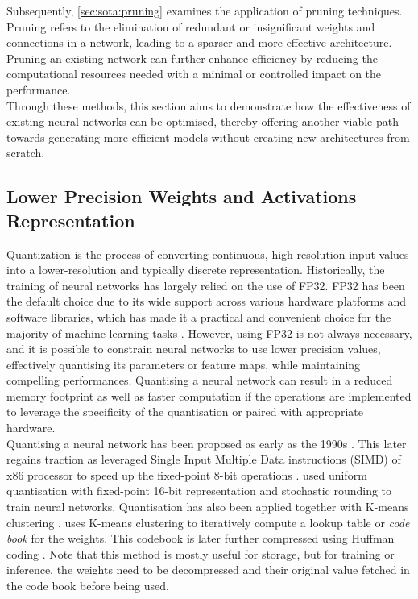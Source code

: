 Subsequently, \cref{sec:sota:pruning} examines the application of
pruning techniques. Pruning refers to the elimination of redundant or
insignificant weights and connections in a network, leading to a sparser and
more effective architecture. Pruning an existing network can further enhance
efficiency by reducing the computational resources needed with a minimal or
controlled impact on the performance.\\

Through these methods, this section aims to demonstrate how the effectiveness of
existing neural networks can be optimised, thereby offering another viable path
towards generating more efficient models without creating new architectures from
scratch.\\

\subsection{Lower Precision Weights and Activations Representation}\label{sec:sota:quantisation}

Quantization is the process of converting continuous, high-resolution input
values into a lower-resolution and typically discrete representation.
Historically, the training of neural networks has largely relied on the use of
\ac{FP32}. \ac{FP32} has been the default choice due to its wide support across
various hardware platforms and software libraries, which has made it a practical
and convenient choice for the majority of machine learning tasks
\cite{sze2017efficient}. However, using \acl{FP32} is not always necessary, and
it is possible to constrain neural networks to use lower precision values,
effectively quantising its parameters or feature maps, while maintaining
compelling performances. Quantising a neural network can result in a reduced
memory footprint as well as faster computation if the operations are implemented
to leverage the specificity of the quantisation or paired with appropriate
hardware.\\

Quantising a neural network has been proposed as early as the 1990s
\cite{balzer1991weight,fiesler1990weight}. This later regains traction as
\citeauthor{37631} leveraged Single Input Multiple Data instructions (SIMD) of
x86 processor to speed up the fixed-point 8-bit operations \cite{37631}.
\citeauthor{gupta2015deep} \cite{gupta2015deep} used uniform quantisation with
fixed-point 16-bit representation and stochastic rounding to train neural
networks. Quantisation has also been applied together with K-means clustering
\cite{steinhaus1956division}. \cite{DBLP:journals/corr/HanMD15} uses K-means
clustering to iteratively compute a lookup table or \emph{code book} for the
weights. This codebook is later further compressed using Huffman coding
\cite{huffman1952method}. Note that this method is mostly useful for storage,
but for training or inference, the weights need to be decompressed and their
original value fetched in the code book before being used.\\

